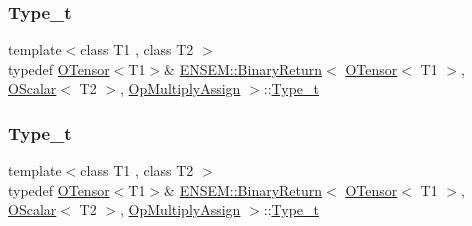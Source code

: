 \subsubsection{\texorpdfstring{Type\_t}{Type\_t}\hspace{0.1cm}{\footnotesize\ttfamily [1/3]}}
{\footnotesize\ttfamily template$<$class T1 , class T2 $>$ \\
typedef \mbox{\hyperlink{classENSEM_1_1OTensor}{O\+Tensor}}$<$T1$>$\& \mbox{\hyperlink{structENSEM_1_1BinaryReturn}{E\+N\+S\+E\+M\+::\+Binary\+Return}}$<$ \mbox{\hyperlink{classENSEM_1_1OTensor}{O\+Tensor}}$<$ T1 $>$, \mbox{\hyperlink{classENSEM_1_1OScalar}{O\+Scalar}}$<$ T2 $>$, \mbox{\hyperlink{structENSEM_1_1OpMultiplyAssign}{Op\+Multiply\+Assign}} $>$\+::\mbox{\hyperlink{structENSEM_1_1BinaryReturn_3_01OTensor_3_01T1_01_4_00_01OScalar_3_01T2_01_4_00_01OpMultiplyAssign_01_4_ad42bea7881ddc7ca27cdfff7655d17fe}{Type\+\_\+t}}}

\mbox{\label{structENSEM_1_1BinaryReturn_3_01OTensor_3_01T1_01_4_00_01OScalar_3_01T2_01_4_00_01OpMultiplyAssign_01_4_ad42bea7881ddc7ca27cdfff7655d17fe}} 
\subsubsection{\texorpdfstring{Type\_t}{Type\_t}\hspace{0.1cm}{\footnotesize\ttfamily [2/3]}}
{\footnotesize\ttfamily template$<$class T1 , class T2 $>$ \\
typedef \mbox{\hyperlink{classENSEM_1_1OTensor}{O\+Tensor}}$<$T1$>$\& \mbox{\hyperlink{structENSEM_1_1BinaryReturn}{E\+N\+S\+E\+M\+::\+Binary\+Return}}$<$ \mbox{\hyperlink{classENSEM_1_1OTensor}{O\+Tensor}}$<$ T1 $>$, \mbox{\hyperlink{classENSEM_1_1OScalar}{O\+Scalar}}$<$ T2 $>$, \mbox{\hyperlink{structENSEM_1_1OpMultiplyAssign}{Op\+Multiply\+Assign}} $>$\+::\mbox{\hyperlink{structENSEM_1_1BinaryReturn_3_01OTensor_3_01T1_01_4_00_01OScalar_3_01T2_01_4_00_01OpMultiplyAssign_01_4_ad42bea7881ddc7ca27cdfff7655d17fe}{Type\+\_\+t}}}

